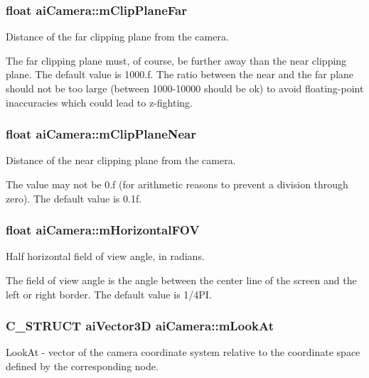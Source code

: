 \subsubsection[{\texorpdfstring{m\+Clip\+Plane\+Far}{mClipPlaneFar}}]{\setlength{\rightskip}{0pt plus 5cm}float ai\+Camera\+::m\+Clip\+Plane\+Far}\hypertarget{structai_camera_aa9ccf77e3d7ca3dc8f46df931b65172f}{}\label{structai_camera_aa9ccf77e3d7ca3dc8f46df931b65172f}
Distance of the far clipping plane from the camera.

The far clipping plane must, of course, be further away than the near clipping plane. The default value is 1000.\+f. The ratio between the near and the far plane should not be too large (between 1000-\/10000 should be ok) to avoid floating-\/point inaccuracies which could lead to z-\/fighting. 
\subsubsection[{\texorpdfstring{m\+Clip\+Plane\+Near}{mClipPlaneNear}}]{\setlength{\rightskip}{0pt plus 5cm}float ai\+Camera\+::m\+Clip\+Plane\+Near}\hypertarget{structai_camera_a720e8c94c036dcefe4b13cc1c69c521e}{}\label{structai_camera_a720e8c94c036dcefe4b13cc1c69c521e}
Distance of the near clipping plane from the camera.

The value may not be 0.\+f (for arithmetic reasons to prevent a division through zero). The default value is 0.\+1f. 
\subsubsection[{\texorpdfstring{m\+Horizontal\+F\+OV}{mHorizontalFOV}}]{\setlength{\rightskip}{0pt plus 5cm}float ai\+Camera\+::m\+Horizontal\+F\+OV}\hypertarget{structai_camera_adcdea73ece19ea0a9068f5544ec23592}{}\label{structai_camera_adcdea73ece19ea0a9068f5544ec23592}
Half horizontal field of view angle, in radians.

The field of view angle is the angle between the center line of the screen and the left or right border. The default value is 1/4\+PI. 
\subsubsection[{\texorpdfstring{m\+Look\+At}{mLookAt}}]{\setlength{\rightskip}{0pt plus 5cm}C\+\_\+\+S\+T\+R\+U\+CT {\bf ai\+Vector3D} ai\+Camera\+::m\+Look\+At}\hypertarget{structai_camera_af9463249ac870e030fa435b1186cef23}{}\label{structai_camera_af9463249ac870e030fa435b1186cef23}
\textquotesingle{}Look\+At\textquotesingle{} -\/ vector of the camera coordinate system relative to the coordinate space defined by the corresponding node.

